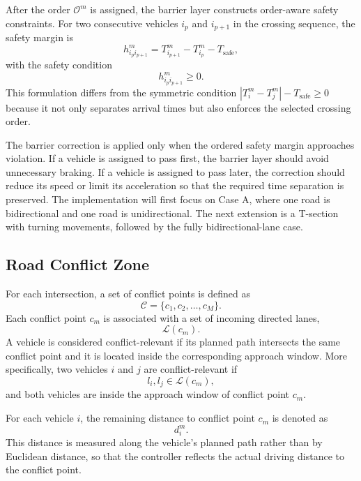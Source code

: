 \documentclass[conference]{IEEEtran}
\begin{document}
After the order $\mathcal{O}^m$ is assigned, the barrier layer constructs order-aware safety constraints. For two consecutive vehicles $i_p$ and $i_{p+1}$ in the crossing sequence, the safety margin is
\begin{equation}
h_{i_p i_{p+1}}^m
=
T_{i_{p+1}}^m - T_{i_p}^m - T_{\text{safe}},
\end{equation}
with the safety condition
\begin{equation}
h_{i_p i_{p+1}}^m \geq 0.
\end{equation}
This formulation differs from the symmetric condition $|T_i^m-T_j^m|-T_{\text{safe}}\geq 0$ because it not only separates arrival times but also enforces the selected crossing order.

The barrier correction is applied only when the ordered safety margin approaches violation. If a vehicle is assigned to pass first, the barrier layer should avoid unnecessary braking. If a vehicle is assigned to pass later, the correction should reduce its speed or limit its acceleration so that the required time separation is preserved. The implementation will first focus on Case A, where one road is bidirectional and one road is unidirectional. The next extension is a T-section with turning movements, followed by the fully bidirectional-lane case.
\endgroup

\subsection{Road Conflict Zone}
For each intersection, a set of conflict points is defined as
\begin{equation}
\mathcal{C}=\{c_1,c_2,\ldots,c_M\}.
\end{equation}
Each conflict point $c_m$ is associated with a set of incoming directed lanes,
\begin{equation}
\mathcal{L}(c_m).
\end{equation}
A vehicle is considered conflict-relevant if its planned path intersects the same conflict point and it is located inside the corresponding approach window. More specifically, two vehicles $i$ and $j$ are conflict-relevant if
\begin{equation}
l_i,l_j \in \mathcal{L}(c_m),
\end{equation}
and both vehicles are inside the approach window of conflict point $c_m$.

For each vehicle $i$, the remaining distance to conflict point $c_m$ is denoted as
\begin{equation}
d_i^m.
\end{equation}
This distance is measured along the vehicle's planned path rather than by Euclidean distance, so that the controller reflects the actual driving distance to the conflict point.
\end{document}
